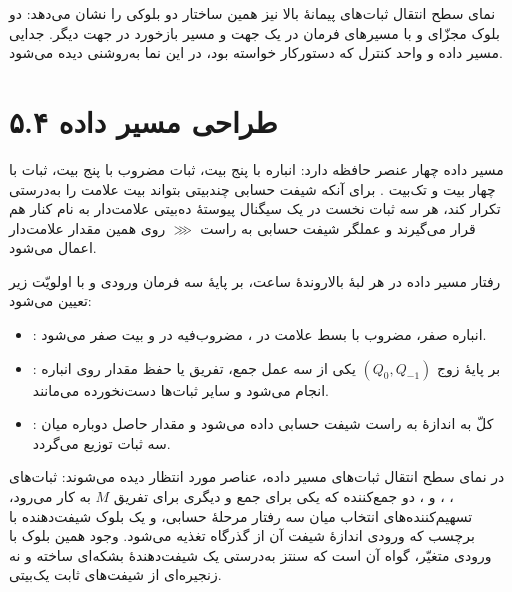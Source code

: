 \documentclass[12pt,a4paper]{article}
\begin{document}
	نمای سطح انتقال ثبات‌های پیمانهٔ بالا نیز همین ساختار دو بلوکی را نشان می‌دهد: دو بلوک مجزّای  و  با مسیرهای فرمان در یک جهت و مسیر بازخورد  در جهت دیگر. جدایی مسیر داده و واحد کنترل که دستورکار خواسته بود، در این نما به‌روشنی دیده می‌شود.


	\section*{۵.۴ طراحی مسیر داده}
	مسیر داده چهار عنصر حافظه دارد: انباره  با پنج بیت، ثبات مضروب  با پنج بیت، ثبات  با چهار بیت و تک‌بیت . برای آنکه شیفت حسابی چندبیتی بتواند بیت علامت را به‌درستی تکرار کند، هر سه ثبات نخست در یک سیگنال پیوستهٔ ده‌بیتی علامت‌دار به نام  کنار هم قرار می‌گیرند و عملگر شیفت حسابی به راست \(\ggg\) روی همین مقدار علامت‌دار اعمال می‌شود.

	رفتار مسیر داده در هر لبهٔ بالاروندهٔ ساعت، بر پایهٔ سه فرمان ورودی و با اولویّت زیر تعیین می‌شود:
	\begin{itemize}
		\item {}: انباره صفر، مضروب با بسط علامت در ، مضروب‌فیه در  و بیت  صفر می‌شود.
		\item {}: بر پایهٔ زوج \((Q_0,Q_{-1})\) یکی از سه عمل جمع، تفریق یا حفظ مقدار روی انباره انجام می‌شود و سایر ثبات‌ها دست‌نخورده می‌مانند.
		\item {}: کلّ  به اندازهٔ  به راست شیفت حسابی داده می‌شود و مقدار حاصل دوباره میان سه ثبات توزیع می‌گردد.
	\end{itemize}


	در نمای سطح انتقال ثبات‌های مسیر داده، عناصر مورد انتظار دیده می‌شوند: ثبات‌های ، ،  و ، دو جمع‌کننده که یکی برای جمع و دیگری برای تفریق \(M\) به کار می‌رود، تسهیم‌کننده‌های انتخاب میان سه رفتار مرحلهٔ حسابی، و یک بلوک شیفت‌دهنده با برچسب  که ورودی اندازهٔ شیفت آن از گذرگاه  تغذیه می‌شود. وجود همین بلوک با ورودی متغیّر، گواه آن است که سنتز به‌درستی یک شیفت‌دهندهٔ بشکه‌ای ساخته و نه زنجیره‌ای از شیفت‌های ثابت یک‌بیتی.
\end{document}
